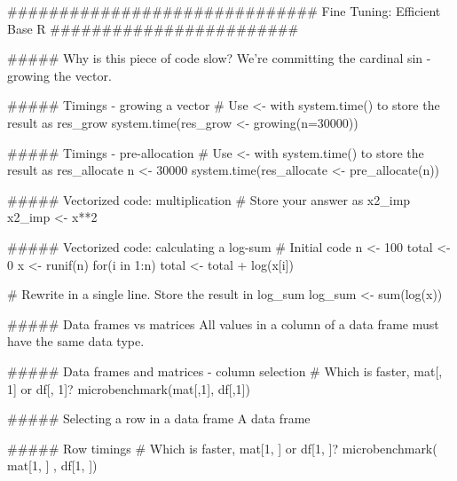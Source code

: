 ############################## Fine Tuning: Efficient Base R   ########################

##### Why is this piece of code slow?
We're committing the cardinal sin - growing the vector.

##### Timings - growing a vector
# Use <- with system.time() to store the result as res_grow
system.time(res_grow <- growing(n=30000))

##### Timings - pre-allocation
# Use <- with system.time() to store the result as res_allocate
n <- 30000
system.time(res_allocate <- pre_allocate(n))

##### Vectorized code: multiplication
# Store your answer as x2_imp
x2_imp <- x**2

##### Vectorized code: calculating a log-sum
# Initial code
n <- 100
total <- 0
x <- runif(n)
for(i in 1:n) 
    total <- total + log(x[i])

# Rewrite in a single line. Store the result in log_sum
log_sum <- sum(log(x))

##### Data frames vs matrices
All values in a column of a data frame must have the same data type.

##### Data frames and matrices - column selection
# Which is faster, mat[, 1] or df[, 1]? 
microbenchmark(mat[,1], df[,1])

##### Selecting a row in a data frame
A data frame

##### Row timings
# Which is faster, mat[1, ] or df[1, ]? 
microbenchmark( mat[1, ] , df[1, ])
